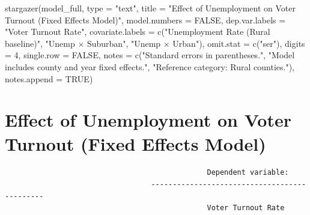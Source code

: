 \documentclass[
  11pt,
]{article}
\newenvironment{Shaded}{\begin{snugshade}}{\end{snugshade}}
\newcommand{\AttributeTok}[1]{\textcolor[rgb]{0.40,0.45,0.13}{#1}}
\newcommand{\ConstantTok}[1]{\textcolor[rgb]{0.56,0.35,0.01}{#1}}
\newcommand{\DecValTok}[1]{\textcolor[rgb]{0.68,0.00,0.00}{#1}}
\newcommand{\FunctionTok}[1]{\textcolor[rgb]{0.28,0.35,0.67}{#1}}
\newcommand{\NormalTok}[1]{\textcolor[rgb]{0.00,0.23,0.31}{#1}}
\newcommand{\StringTok}[1]{\textcolor[rgb]{0.13,0.47,0.30}{#1}}
\begin{document}
\begin{Shaded}
\begin{Highlighting}[]
\FunctionTok{stargazer}\NormalTok{(model\_full,}
          \AttributeTok{type =} \StringTok{"text"}\NormalTok{,}
          \AttributeTok{title =} \StringTok{"Effect of Unemployment on Voter Turnout (Fixed Effects Model)"}\NormalTok{,}
          \AttributeTok{model.numbers =} \ConstantTok{FALSE}\NormalTok{,}
          \AttributeTok{dep.var.labels =} \StringTok{"Voter Turnout Rate"}\NormalTok{,}
          \AttributeTok{covariate.labels =} \FunctionTok{c}\NormalTok{(}\StringTok{"Unemployment Rate (Rural baseline)"}\NormalTok{, }
                               \StringTok{"Unemp × Suburban"}\NormalTok{, }
                               \StringTok{"Unemp × Urban"}\NormalTok{),}
          \AttributeTok{omit.stat =} \FunctionTok{c}\NormalTok{(}\StringTok{"ser"}\NormalTok{),}
          \AttributeTok{digits =} \DecValTok{4}\NormalTok{,}
          \AttributeTok{single.row =} \ConstantTok{FALSE}\NormalTok{,}
          \AttributeTok{notes =} \FunctionTok{c}\NormalTok{(}\StringTok{"Standard errors in parentheses."}\NormalTok{,}
                    \StringTok{"Model includes county and year fixed effects."}\NormalTok{,}
                    \StringTok{"Reference category: Rural counties."}\NormalTok{),}
          \AttributeTok{notes.append =} \ConstantTok{TRUE}\NormalTok{)}
\end{Highlighting}
\end{Shaded}

\section{Effect of Unemployment on Voter Turnout (Fixed Effects
Model)}\label{effect-of-unemployment-on-voter-turnout-fixed-effects-model}

\begin{verbatim}
                                               Dependent variable:             
                                  ---------------------------------------------
                                               Voter Turnout Rate              
\end{verbatim}
\end{document}
